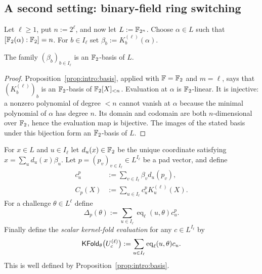 \subsection{A second setting: binary-field ring switching}\label{sec:intro:binary}

\begin{definition}\label{def:intro:binary}
Let $\ell\geq1$, put $n:=2^\ell$, and now let $L:=\mathbb{F}_{2^n}$. Choose $\alpha\in L$ such that $[\mathbb{F}_2(\alpha):\mathbb{F}_2]=n$. For $b\in I_\ell$ set $\beta_b:=K_b^{(\ell)}(\alpha)$.
\end{definition}

\begin{lemma}\label{lem:intro:fieldbasis}
The family $(\beta_b)_{b\in I_\ell}$ is an $\mathbb{F}_2$-basis of $L$.
\end{lemma}
\begin{proof}
Proposition~\ref{prop:intro:basis}, applied with $\mathbb{F}=\mathbb{F}_2$ and $m=\ell$, says that $(K_b^{(\ell)})_b$ is an $\mathbb{F}_2$-basis of $\mathbb{F}_2[X]_{<n}$. Evaluation at $\alpha$ is $\mathbb{F}_2$-linear. It is injective: a nonzero polynomial of degree $<n$ cannot vanish at $\alpha$ because the minimal polynomial of $\alpha$ has degree $n$. Its domain and codomain are both $n$-dimensional over $\mathbb{F}_2$, hence the evaluation map is bijective. The images of the stated basis under this bijection form an $\mathbb{F}_2$-basis of $L$.
\end{proof}

\begin{definition}\label{def:intro:correction}
For $x\in L$ and $u\in I_\ell$ let $d_u(x)\in\mathbb{F}_2$ be the unique coordinate satisfying $x=\sum_u d_u(x)\beta_u$. Let $p=(p_v)_{v\in I_\ell}\in L^{I_\ell}$ be a pad vector, and define
\begin{align}
 c^p_u&:=\sum_{v\in I_\ell}\beta_v d_u(p_v),\label{eq:intro:cp}\\
 C_p(X)&:=\sum_{u\in I_\ell}c^p_u K_u^{(\ell)}(X).\label{eq:intro:cp-poly}
\end{align}
For a challenge $\theta\in L^\ell$ define
\begin{equation}\label{eq:intro:delta}
 \Delta_p(\theta):=\sum_{u\in I_\ell}\operatorname{eq}_\ell(u,\theta)c^p_u.
\end{equation}
Finally define the \emph{scalar kernel-fold evaluation} for any $c\in L^{I_\ell}$ by
\[
 \mathsf{KFold}_\theta\bigl(U_c^{(\ell)}\bigr):=\sum_{u\in I_\ell}\operatorname{eq}_\ell(u,\theta)c_u.
\]
This is well defined by Proposition~\ref{prop:intro:basis}.
\end{definition}

